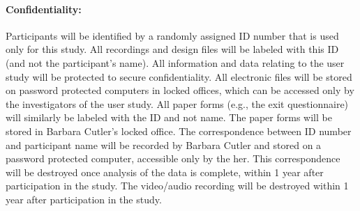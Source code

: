 \documentclass[10pt]{article}
\begin{document}
\paragraph{Confidentiality:}
Participants will be identified by a randomly assigned ID number that
is used only for this study.  All recordings and design files will be
labeled with this ID (and not the participant's name).  All
information and data relating to the user study will be protected to
secure confidentiality.  All electronic files will be stored on
password protected computers in locked offices, which can be accessed
only by the investigators of the user study.  All paper forms (e.g.,
the exit questionnaire) will similarly be labeled with the ID and not
name.  The paper forms will be stored in Barbara Cutler's locked
office.  The correspondence between ID number and participant name
will be recorded by Barbara Cutler and stored on a password protected
computer, accessible only by the her.  This correspondence will be
destroyed once analysis of the data is complete, within 1 year after
participation in the study.  The video/audio recording will be
destroyed within 1 year after participation in the study.
\end{document}
